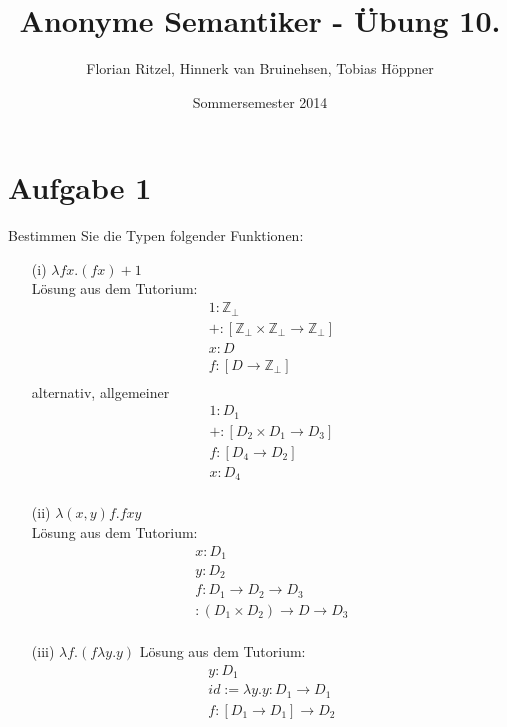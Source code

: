 \documentclass[ngerman,a4paper]{report}
\author{Florian Ritzel, Hinnerk van Bruinehsen, Tobias Höppner}
\title{Anonyme Semantiker - Übung 10. }
\date{Sommersemester 2014}
\renewcommand{\maketitle}{}
\begin{document}
\maketitle
\section*{Aufgabe 1}
Bestimmen Sie die Typen folgender Funktionen:
\begin{itemize}
\item[(i)]$\lambda fx.(fx)+1$\\
Lösung aus dem Tutorium:
\begin{align*}
1: \mathbb{Z}_\perp\\
+: [\mathbb{Z}_\perp \times \mathbb{Z}_\perp \rightarrow \mathbb{Z}_\perp]\\
x: D\\
f: [D \rightarrow \mathbb{Z}_\perp]\\
\end{align*}
alternativ, allgemeiner
\begin{align*}
1: D_1\\
+: [D_2 \times D_1 \rightarrow D_3]\\
f: [D_4 \rightarrow D_2]\\
x: D_4\\
\end{align*}
\item[(ii)] $\lambda(x,y)f.fxy$\\
Lösung aus dem Tutorium:
\begin{align*}
x : D_1\\
y : D_2\\
f : D_1 \rightarrow D_2 \rightarrow D_3\\
: (D_1 \times D_2) \rightarrow D \rightarrow D_3\\
\end{align*}
\item[(iii)] $\lambda f.(f\lambda y.y)$
Lösung aus dem Tutorium:
\begin{align*}
y : D_1\\
id := \lambda y.y : D_1 \rightarrow D_1\\
f : [D_1 \rightarrow D_1] \rightarrow D_2\\
\end{align*}
\end{itemize}
\end{document}
